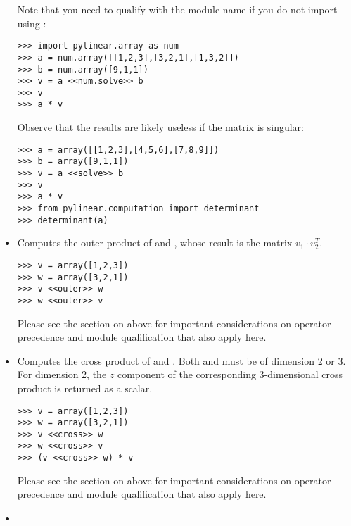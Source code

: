 \begin{itemize}
  Note that you need to qualify  with the module name if you
  do not import  using :

\begin{verbatim}
>>> import pylinear.array as num
>>> a = num.array([[1,2,3],[3,2,1],[1,3,2]])
>>> b = num.array([9,1,1])
>>> v = a <<num.solve>> b
>>> v
>>> a * v
\end{verbatim}

  Observe that the results are likely useless if the matrix
  is singular:

\begin{verbatim}
>>> a = array([[1,2,3],[4,5,6],[7,8,9]])
>>> b = array([9,1,1])
>>> v = a <<solve>> b
>>> v
>>> a * v
>>> from pylinear.computation import determinant
>>> determinant(a)
\end{verbatim}

\item {}
  
  Computes the outer product of  and ,
  whose result is the matrix $v_1 \cdot v_2^T$.

\begin{verbatim}
>>> v = array([1,2,3])
>>> w = array([3,2,1])
>>> v <<outer>> w
>>> w <<outer>> v
\end{verbatim}

  Please see the section on  above for important
  considerations on operator precedence and module qualification
  that also apply here.

\item {}
  
  Computes the cross product of  and .
  Both  and  must be of dimension 2 or 3.
  For dimension 2, the $z$ component of the corresponding 3-dimensional
  cross product is returned as a scalar. 

\begin{verbatim}
>>> v = array([1,2,3])
>>> w = array([3,2,1])
>>> v <<cross>> w
>>> w <<cross>> v
>>> (v <<cross>> w) * v
\end{verbatim}

  Please see the section on  above for important
  considerations on operator precedence and module qualification
  that also apply here.

\item {}
  

\end{itemize}
